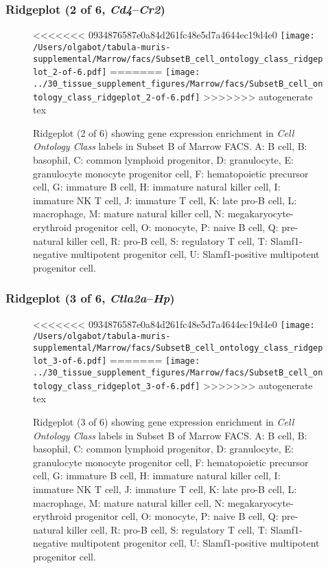 \clearpage

\subsubsection{Ridgeplot (2 of 6, \emph{Cd4}--\emph{Cr2})}
\begin{figure}[h]
\centering
<<<<<<< 0934876587e0a84d261fc48e5d7a4644ec19d4e0
\texttt{[image: /Users/olgabot/tabula-muris-supplemental/Marrow/facs/SubsetB\_cell\_ontology\_class\_ridgeplot\_2-of-6.pdf]}
=======
\texttt{[image: ../30\_tissue\_supplement\_figures/Marrow/facs/SubsetB\_cell\_ontology\_class\_ridgeplot\_2-of-6.pdf]}
>>>>>>> autogenerate tex

\caption{ Ridgeplot (2 of 6)  showing gene expression enrichment in \emph{Cell Ontology Class} labels in Subset B of Marrow FACS. A: B cell, B: basophil, C: common lymphoid progenitor, D: granulocyte, E: granulocyte monocyte progenitor cell, F: hematopoietic precursor cell, G: immature B cell, H: immature natural killer cell, I: immature NK T cell, J: immature T cell, K: late pro-B cell, L: macrophage, M: mature natural killer cell, N: megakaryocyte-erythroid progenitor cell, O: monocyte, P: naive B cell, Q: pre-natural killer cell, R: pro-B cell, S: regulatory T cell, T: Slamf1-negative multipotent progenitor cell, U: Slamf1-positive multipotent progenitor cell.}
\end{figure}


\clearpage

\subsubsection{Ridgeplot (3 of 6, \emph{Ctla2a}--\emph{Hp})}
\begin{figure}[h]
\centering
<<<<<<< 0934876587e0a84d261fc48e5d7a4644ec19d4e0
\texttt{[image: /Users/olgabot/tabula-muris-supplemental/Marrow/facs/SubsetB\_cell\_ontology\_class\_ridgeplot\_3-of-6.pdf]}
=======
\texttt{[image: ../30\_tissue\_supplement\_figures/Marrow/facs/SubsetB\_cell\_ontology\_class\_ridgeplot\_3-of-6.pdf]}
>>>>>>> autogenerate tex

\caption{ Ridgeplot (3 of 6)  showing gene expression enrichment in \emph{Cell Ontology Class} labels in Subset B of Marrow FACS. A: B cell, B: basophil, C: common lymphoid progenitor, D: granulocyte, E: granulocyte monocyte progenitor cell, F: hematopoietic precursor cell, G: immature B cell, H: immature natural killer cell, I: immature NK T cell, J: immature T cell, K: late pro-B cell, L: macrophage, M: mature natural killer cell, N: megakaryocyte-erythroid progenitor cell, O: monocyte, P: naive B cell, Q: pre-natural killer cell, R: pro-B cell, S: regulatory T cell, T: Slamf1-negative multipotent progenitor cell, U: Slamf1-positive multipotent progenitor cell.}
\end{figure}


